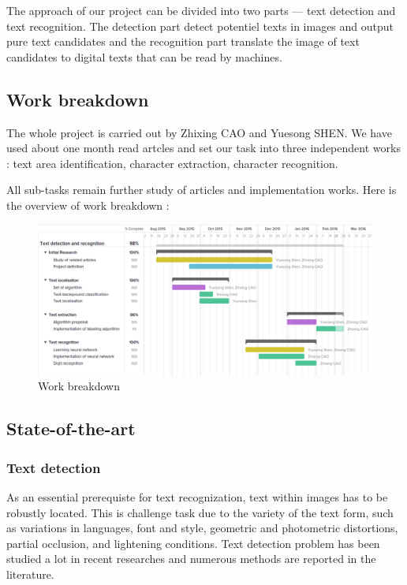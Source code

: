 \documentclass[paper=a4, french, 11pt]{scrartcl}
\begin{document}
The approach of our project can be divided into two parts --- text detection and text recognition. The detection part detect potentiel texts in images and output pure text candidates and the recognition part translate the image of text candidates to digital texts that can be read by machines.

\subsection{Work breakdown}
The whole project is carried out by Zhixing CAO and Yuesong SHEN. We have used about one month read artcles and set our task into three independent works : text area identification, character extraction, character recognition.

All sub-tasks remain further study of articles and implementation works. Here is the overview of work breakdown :

\begin{figure}[h]
\begin{center}
   \includegraphics[width=0.8\linewidth]{breakdowns.png}
\end{center}
\vspace{-4ex}
\caption{Work breakdown}
\label{fig:heatmap}
\end{figure}

\subsection{State-of-the-art}
\subsubsection{Text detection}
As an essential prerequiste for text recognization, text within images has to be robustly located. This is challenge task due to the variety of the text form, such as variations in languages, font and style, geometric and photometric distortions, partial occlusion, and lightening conditions. Text detection problem has been studied a lot in recent researches and numerous methods are reported in the literature.
\end{document}
